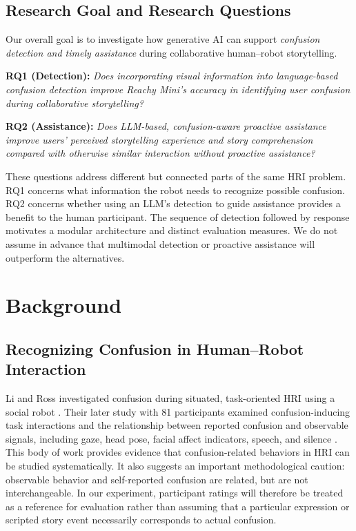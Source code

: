 \documentclass[conference]{IEEEtran}
\begin{document}
\subsection{Research Goal and Research Questions}
Our overall goal is to investigate how generative AI can support \emph{confusion detection and timely assistance} during collaborative human--robot storytelling.

\noindent\textbf{RQ1 (Detection):} \emph{Does incorporating visual information into language-based confusion detection improve Reachy Mini's accuracy in identifying user confusion during collaborative storytelling?}

\noindent\textbf{RQ2 (Assistance):} \emph{Does LLM-based, confusion-aware proactive assistance improve users' perceived storytelling experience and story comprehension compared with otherwise similar interaction without proactive assistance?}

These questions address different but connected parts of the same HRI problem. RQ1 concerns what information the robot needs to recognize possible confusion. RQ2 concerns whether using an LLM's detection to guide assistance provides a benefit to the human participant. The sequence of detection followed by response motivates a modular architecture and distinct evaluation measures. We do not assume in advance that multimodal detection or proactive assistance will outperform the alternatives.


\section{Background}
\subsection{Recognizing Confusion in Human--Robot Interaction}
Li and Ross investigated confusion during situated, task-oriented HRI using a social robot \cite{li2023hmm}. Their later study with 81 participants examined confusion-inducing task interactions and the relationship between reported confusion and observable signals, including gaze, head pose, facial affect indicators, speech, and silence \cite{li2023invoking}. This body of work provides evidence that confusion-related behaviors in HRI can be studied systematically. It also suggests an important methodological caution: observable behavior and self-reported confusion are related, but are not interchangeable. In our experiment, participant ratings will therefore be treated as a reference for evaluation rather than assuming that a particular expression or scripted story event necessarily corresponds to actual confusion.
\end{document}
